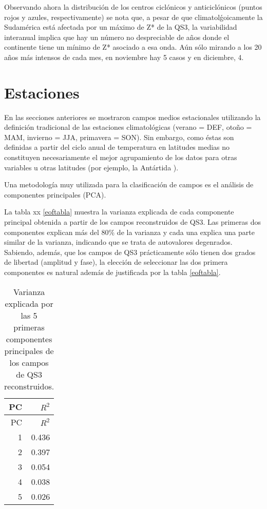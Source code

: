 \documentclass[spanish,a4paper]{book}
\begin{document}
Observando ahora la distribución de los centros ciclónicos y
anticiclónicos (puntos rojos y azules,
respectivamente)
se nota que, a pesar de que climatolǵoicamente la Sudamérica está
afectada por un máximo de Z* de la QS3, la variabilidad interanual
implica que hay un número no despreciable de años donde el continente
tiene un mínimo de Z* asociado a esa onda. Aún sólo mirando a los 20
años más intensos de cada mes, en noviembre hay 5 casos y en diciembre,
4.

\section{Estaciones}\label{estaciones}

En las secciones anteriores se mostraron campos medios estacionales
utilizando la definición tradicional de las estaciones climatológicas
(verano = DEF, otoño = MAM, invierno = JJA, primavera = SON). Sin
embargo, como éstas son definidas a partir del ciclo anual de
temperatura en latitudes medias no constituyen necesariamente el mejor
agrupamiento de los datos para otras variables u otras latitudes (por
ejemplo, la Antártida ).

Una metodología muy utilizada para la clasificación de campos es el
análisis de componentes principales
(PCA).

La tabla xx \ref{eoftabla} muestra la
varianza explicada de cada componente principal obtenida a partir de los
campos reconstruidos de QS3. Las primeras dos componentes explican más
del 80\% de la varianza y cada una explica una parte similar de la
varianza, indicando que se trata de autovalores
degenrados. Sabiendo, además, que los campos
de QS3 prácticamente sólo tienen dos grados de libertad (amplitud y
fase), la elección de seleccionar las dos primera componentes es natural
además de justificada por la tabla \ref{eoftabla}.

\begin{longtable}[]{@{}rr@{}}
\caption{Varianza explicada por las 5 primeras componentes principales
de los campos de QS3 reconstruidos.}\tabularnewline
\toprule
PC & \(R^2\)\tabularnewline
\midrule
\endfirsthead
\toprule
PC & \(R^2\)\tabularnewline
\midrule
\endhead
1 & 0.436\tabularnewline
2 & 0.397\tabularnewline
3 & 0.054\tabularnewline
4 & 0.038\tabularnewline
5 & 0.026\tabularnewline
\bottomrule
\end{longtable}
\end{document}
